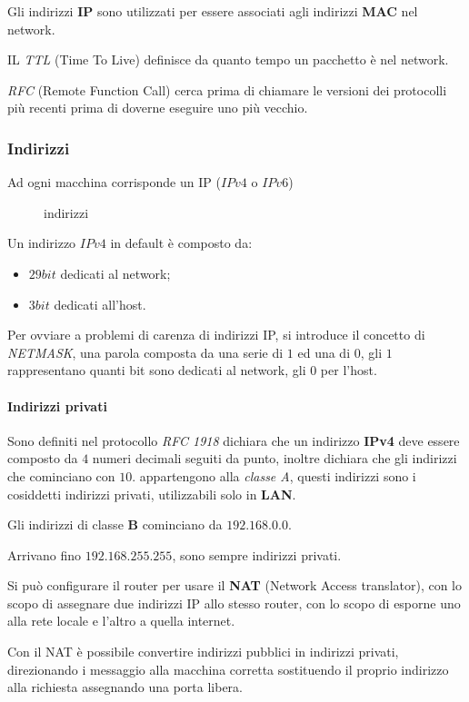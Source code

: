 Gli indirizzi \textbf{IP} sono utilizzati per essere associati agli indirizzi
\textbf{MAC} nel network.

IL \emph{TTL} (Time To Live) definisce da quanto tempo un pacchetto è nel
network.

\emph{RFC} (Remote Function Call) cerca prima di chiamare le versioni dei
protocolli più recenti prima di doverne eseguire uno più vecchio.

\subsubsection{Indirizzi}
Ad ogni macchina corrisponde un IP ($IPv4$ o $IPv6$)
\begin{figure}[H]
    \centering
    \caption{indirizzi}
    \label{fig:indirizzi}
\end{figure}

Un indirizzo $IPv4$ in default è composto da:
\begin{itemize}
  \item $29bit$ dedicati al network;
  \item $3bit$ dedicati all'host.
\end{itemize}
Per ovviare a problemi di carenza di indirizzi IP, si introduce il concetto
di \emph{NETMASK}, una parola composta da una serie di $1$ ed una di $0$, gli
$1$ rappresentano quanti bit sono dedicati al network, gli $0$ per l'host.

\paragraph{Indirizzi privati}
Sono definiti nel protocollo \emph{RFC 1918} dichiara che un indirizzo
\textbf{IPv4} deve essere composto da $4$ numeri decimali seguiti da punto,
inoltre dichiara che gli indirizzi che cominciano con $10.$ appartengono alla
\emph{classe A}, questi indirizzi sono i cosiddetti indirizzi privati,
utilizzabili solo in \textbf{LAN}.

Gli indirizzi di classe \textbf{B} cominciano da $192.168.0.0$.

Arrivano fino $192.168.255.255$, sono sempre indirizzi privati.

Si può configurare il router per usare il \textbf{NAT} (Network Access
translator), con lo scopo di assegnare due indirizzi IP allo stesso router,
con lo scopo di esporne uno alla rete locale e l'altro a quella internet.

Con il NAT è possibile convertire indirizzi pubblici in indirizzi privati,
direzionando i messaggio alla macchina corretta sostituendo il proprio
indirizzo alla richiesta assegnando una porta libera.

